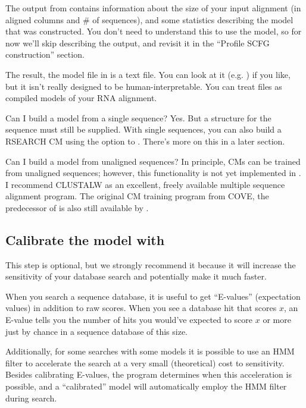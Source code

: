The output from  contains information about the size of your
input alignment (in aligned columns and \# of sequences), and some statistics
describing the model that was constructed. You don't need to understand this to
use the model, so for now we'll skip describing the output, and
revisit it in the ``Profile SCFG construction'' section.

The result, the model file in  is a text file. You can
look at it (e.g. ) if you like, but it isn't really
designed to be human-interpretable. You can treat  files as
compiled models of your RNA alignment.

\begin{srefaq}{Can I build a model from a single sequence?}
Yes. But a structure for the sequence must still be supplied.
With single sequences, you can also build a RSEARCH \cite{KleinEddy03} CM 
using the  option to . There's more on
this in a later section.
\end{srefaq}

\begin{srefaq}{Can I build a model from unaligned sequences?}
In principle, CMs can be trained from unaligned sequences;
however, this functionality is not yet implemented in .  I
recommend CLUSTALW as an excellent, freely available multiple sequence
alignment program. The original  CM training
program from COVE, the predecessor of  is also
still available by
.
\end{srefaq}

\subsection{Calibrate the model with }

This step is optional, but we strongly recommend it because it will
increase the sensitivity of your database search and potentially make
it much faster.

When you search a sequence database, it is useful to get ``E-values''
(expectation values) in addition to raw scores. When you see a
database hit that scores $x$, an E-value tells you the number of hits
you would've expected to score $x$ or more just by chance in a
sequence database of this size. 

Additionally, for some searches with some models it is possible to use
an HMM filter to accelerate the search at a very small (theoretical)
cost to sensitivity. Besides calibrating E-values, the
 program determines when this acceleration is
possible, and a ``calibrated'' model will automatically employ the HMM
filter during search.

